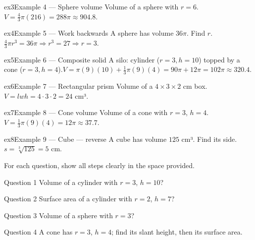 \documentclass[11pt]{article}
\begin{document}
\begin{example}{ex3}{Example 4 --- Sphere volume}
Volume of a sphere with $r=6$.\soln $V=\tfrac43\pi(216)=288\pi\approx904.8$.
\end{example}

\begin{example}{ex4}{Example 5 --- Work backwards}
A sphere has volume $36\pi$. Find $r$.\soln $\tfrac43\pi r^3=36\pi\Rightarrow r^3=27\Rightarrow r=3$.
\end{example}

\begin{example}{ex5}{Example 6 --- Composite solid}
A silo: cylinder ($r=3,h=10$) topped by a cone ($r=3,h=4$).\soln $V=\pi(9)(10)+\tfrac13\pi(9)(4)=90\pi+12\pi=102\pi\approx320.4$.
\end{example}

\begin{example}{ex6}{Example 7 --- Rectangular prism}
Volume of a $4\times3\times2$ cm box.\soln $V=lwh=4\cdot3\cdot2=24$ cm³.
\end{example}

\begin{example}{ex7}{Example 8 --- Cone volume}
Volume of a cone with $r=3$, $h=4$.\soln $V=\tfrac13\pi(9)(4)=12\pi\approx37.7$.
\end{example}

\begin{example}{ex8}{Example 9 --- Cube — reverse}
A cube has volume $125$ cm³. Find its side.\soln $s=\sqrt[3]{125}=5$ cm.
\end{example}

\clearpage
{}
For each question, show all steps clearly in the space provided.

\begin{qbox}{Question 1}
Volume of a cylinder with $r=3$, $h=10$?\workspace{2.4cm}
\end{qbox}

\begin{qbox}{Question 2}
Surface area of a cylinder with $r=2$, $h=7$?\workspace{2.4cm}
\end{qbox}

\begin{qbox}{Question 3}
Volume of a sphere with $r=3$?\workspace{2.4cm}
\end{qbox}

\begin{qbox}{Question 4}
A cone has $r=3$, $h=4$; find its slant height, then its surface area.\workspace{2.6cm}
\end{qbox}
\end{document}
